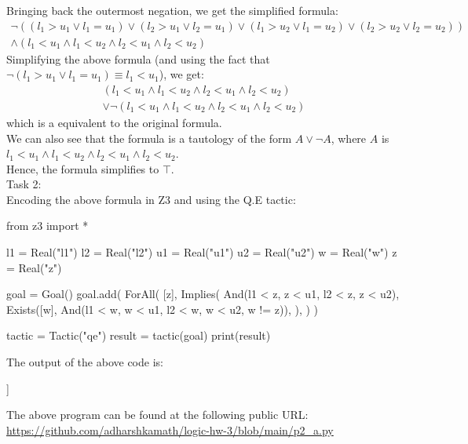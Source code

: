 \documentclass[12pt,letterpaper, onecolumn]{exam}
\newcommand{\link}[1]{{\color{blue}\href{#1}{#1}}}
\begin{document}
\begin{questions}
	Bringing back the outermost negation, we get the simplified formula:
	\begin{align*}
		\neg 
		((l_1 > u_1 \lor l_1 = u_1) \lor (l_2 > u_1 \lor l_2 = u_1) \lor (l_1 > u_2 \lor l_1 = u_2) \lor (l_2 > u_2 \lor l_2 = u_2)) \\
		\land (l_1 < u_1 \land l_1 < u_2 \land l_2 < u_1 \land l_2 < u_2)
	\end{align*}
	Simplifying the above formula (and using the fact that $ \neg (l_1 > u_1 \lor l_1 = u_1) \equiv l_1 < u_1 $), we get:
	\begin{align*}
		(l_1 < u_1 \land l_1 < u_2 \land l_2 < u_1 \land l_2 < u_2) \\
		\lor \neg (l_1 < u_1 \land l_1 < u_2 \land l_2 < u_1 \land l_2 < u_2)
	\end{align*}
	which is a equivalent to the original formula. \\	
	We can also see that the formula is a tautology of the form $ A \lor \neg A $, where $ A $ is $ l_1 < u_1 \land l_1 < u_2 \land l_2 < u_1 \land l_2 < u_2 $. \\
	Hence, the formula simplifies to $ \top $. \\

	Task 2: \\
	Encoding the above formula in Z3 and using the Q.E tactic:
	\begin{python}
		from z3 import *

l1 = Real("l1")
l2 = Real("l2")
u1 = Real("u1")
u2 = Real("u2")
w = Real("w")
z = Real("z")

goal = Goal()
goal.add(
    ForAll(
        [z],
        Implies(
            And(l1 < z, z < u1, l2 < z, z < u2),
            Exists([w], And(l1 < w, w < u1, l2 < w, w < u2, w != z)),
        ),
    )
)

tactic = Tactic("qe")
result = tactic(goal)
print(result)
	\end{python}
	The output of the above code is:
	\begin{python}
[[]]
	\end{python}
	The above program can be found at the following public URL: \\
	\link{https://github.com/adharshkamath/logic-hw-3/blob/main/p2\_a.py}


\end{questions}
\end{document}
